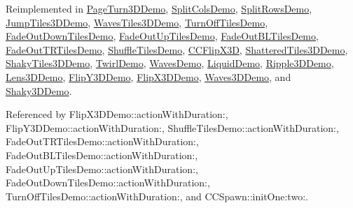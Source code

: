 Reimplemented in \hyperlink{interface_page_turn3_d_demo_ad9da603f0df888efeb47e924d797a733}{Page\-Turn3\-D\-Demo}, \hyperlink{interface_split_cols_demo_aa4c77d636404af8a73281a953c10b3ad}{Split\-Cols\-Demo}, \hyperlink{interface_split_rows_demo_aee59b03abf9d9f78c059a55fd8259bd0}{Split\-Rows\-Demo}, \hyperlink{interface_jump_tiles3_d_demo_a825706a9e5d4c89578af8c04d483e001}{Jump\-Tiles3\-D\-Demo}, \hyperlink{interface_waves_tiles3_d_demo_a8831a929f08852b77475c64909598106}{Waves\-Tiles3\-D\-Demo}, \hyperlink{interface_turn_off_tiles_demo_aa72fdb390e5921f9d43bbf1c4cce48ad}{Turn\-Off\-Tiles\-Demo}, \hyperlink{interface_fade_out_down_tiles_demo_a3415e3131863060190a02aa6cebd6298}{Fade\-Out\-Down\-Tiles\-Demo}, \hyperlink{interface_fade_out_up_tiles_demo_a7cc0944d5911af45f01b99c3c51e3f75}{Fade\-Out\-Up\-Tiles\-Demo}, \hyperlink{interface_fade_out_b_l_tiles_demo_ad13752a704cedf99bc49df9a03b3cc92}{Fade\-Out\-B\-L\-Tiles\-Demo}, \hyperlink{interface_fade_out_t_r_tiles_demo_ad82e52f8570462f67365b6d936274b99}{Fade\-Out\-T\-R\-Tiles\-Demo}, \hyperlink{interface_shuffle_tiles_demo_ad54afeb4935f93e79aa8bc7d2e2ce439}{Shuffle\-Tiles\-Demo}, \hyperlink{interface_c_c_flip_x3_d_a61912e0504905ba58097d732977c416f}{C\-C\-Flip\-X3\-D}, \hyperlink{interface_shattered_tiles3_d_demo_a329676c361fb524b09f5f29b1d35ba6e}{Shattered\-Tiles3\-D\-Demo}, \hyperlink{interface_shaky_tiles3_d_demo_a871e8a6d3dfc3cc231bac3d4046a251f}{Shaky\-Tiles3\-D\-Demo}, \hyperlink{interface_twirl_demo_a1992b8eecd0f5130043748641c6f38ce}{Twirl\-Demo}, \hyperlink{interface_waves_demo_abca58c64fe1f2c9b785030fa4b29fe04}{Waves\-Demo}, \hyperlink{interface_liquid_demo_a4a50d2693efec8041c34b53b017491a1}{Liquid\-Demo}, \hyperlink{interface_ripple3_d_demo_afd8307d97228b9186866f300797108c7}{Ripple3\-D\-Demo}, \hyperlink{interface_lens3_d_demo_ae3fc3ba830dbe263c0d294c0d1a1e3d1}{Lens3\-D\-Demo}, \hyperlink{interface_flip_y3_d_demo_abe7a83e351b66a957b13624a3aa4c140}{Flip\-Y3\-D\-Demo}, \hyperlink{interface_flip_x3_d_demo_ad3338f96edfbf5b140c591829e933b5d}{Flip\-X3\-D\-Demo}, \hyperlink{interface_waves3_d_demo_a14107bfe1037386bf1f3094cc8488949}{Waves3\-D\-Demo}, and \hyperlink{interface_shaky3_d_demo_a8ec26c40412e97d89b87f973228ae67d}{Shaky3\-D\-Demo}.



Referenced by Flip\-X3\-D\-Demo\-::action\-With\-Duration\-:, Flip\-Y3\-D\-Demo\-::action\-With\-Duration\-:, Shuffle\-Tiles\-Demo\-::action\-With\-Duration\-:, Fade\-Out\-T\-R\-Tiles\-Demo\-::action\-With\-Duration\-:, Fade\-Out\-B\-L\-Tiles\-Demo\-::action\-With\-Duration\-:, Fade\-Out\-Up\-Tiles\-Demo\-::action\-With\-Duration\-:, Fade\-Out\-Down\-Tiles\-Demo\-::action\-With\-Duration\-:, Turn\-Off\-Tiles\-Demo\-::action\-With\-Duration\-:, and C\-C\-Spawn\-::init\-One\-:two\-:.


